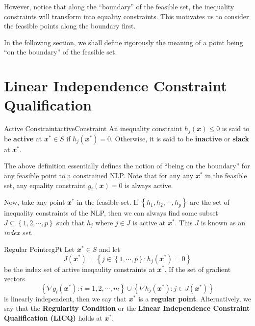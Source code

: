 \documentclass[math, code]{amznotes}
\theoremstyle{remark}
\begin{document}
However, notice that along the ``boundary'' of the feasible set, the inequality constraints will transform into equality constraints. This motivates us to consider the feasible points along the boundary first.

In the following section, we shall define rigorously the meaning of a point being ``on the boundary'' of the feasible set.
\section{Linear Independence Constraint Qualification}
\begin{dfnbox}{Active Constraint}{activeConstraint}
    An inequality constraint $h_j(\mathbfit{x}) \leq 0$ is said to be {\color{red} \textbf{active}} at $\mathbfit{x}^* \in S$ if $h_j(\mathbfit{x}^*) = 0$. Otherwise, it is said to be {\color{red} \textbf{inactive}} or {\color{red} \textbf{slack}} at $\mathbfit{x}^*$.
\end{dfnbox}
The above definition essentially defines the notion of ``being on the boundary'' for any feasible point to a constrained NLP. Note that for any any $\mathbfit{x}^*$ in the feasible set, any equality constraint $g_i(\mathbfit{x}) = 0$ is always active.

Now, take any point $\mathbfit{x}^*$ in the feasible set. If $\left\{h_1, h_2, \cdots, h_p\right\}$ are the set of inequality constraints of the NLP, then we can always find some subset $J \subseteq \left\{1, 2, \cdots, p\right\}$ such that $h_j$ where $j \in J$ is active at $\mathbfit{x}^*$. This $J$ is known as an \textit{index set}.
\begin{dfnbox}{Regular Point}{regPt}
    Let $\mathbfit{x}^* \in S$ and let
    \begin{equation*}
        J(\mathbfit{x}^*) = \left\{j \in \left\{1, \cdots, p\right\} \colon h_j(\mathbfit{x}^*) = 0\right\}
    \end{equation*}
    be the index set of active ineqaulity constraints at $
    \mathbfit{x}^*$. If the set of gradient vectors
    \begin{equation*}
        \left\{\nabla g_i(\mathbfit{x}^*) \colon i = 1, 2, \cdots, m\right\} \cup \left\{\nabla h_j(\mathbfit{x}^*) \colon j \in J(\mathbfit{x}^*)\right\}
    \end{equation*}
    is linearly independent, then we say that $\mathbfit{x}^*$ is a {\color{red} \textbf{regular point}}. Alternatively, we say that the {\color{red} \textbf{Regularity Condition}} or the {\color{red} \textbf{Linear Independence Constraint Qualification (LICQ)}} holds at $\mathbfit{x}^*$.
\end{dfnbox}
\end{document}
